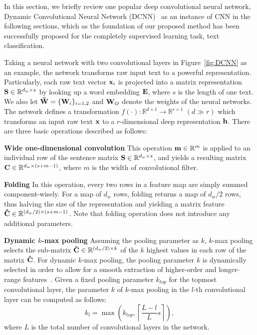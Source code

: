 \documentclass[review]{elsarticle}
\begin{document}

In this section, we briefly review one popular deep convolutional neural network, Dynamic Convolutional Neural Network (DCNN)~\cite{16_blunsom2014convolutional} as an instance of CNN in the following sections, which as the foundation of our proposed method has been successfully proposed for the completely supervised learning task, text classification.

Taking a neural network with two convolutional layers in Figure~\ref{fig:DCNN} as an example, the network transforms raw input text to a powerful representation. Particularly, each raw text vector \({{\bf{x}}_i}\) is projected into a matrix representation \({\bf{S}} \in {\mathbb{R}^{{d_w} \times s}}\) by looking up a word embedding \({\bf{E}}\), where \({s}\) is the length of one text. We also let \({\bf{\tilde W}} = {\{ {{\bf{W}}_i}\} _{i = 1,2}}\) and \({{\bf{W}}_O}\) denote the weights of the neural networks. The network defines a transformation \(f( \cdot ):{\mathbb{R}^{d \times 1}} \to {\mathbb{R}^{r \times 1}}\) \((d \gg r)\) which transforms an input raw text \({\bf{x}}\) to a \(r\)-dimensional deep representation \({\bf{h}}\). There are three basic operations described as follows:

 {\bf{Wide one-dimensional convolution}} This operation \({\bf{m}} \in {\mathbb{R}^m}\) is applied to an individual row of the sentence matrix \({\bf{S}} \in {\mathbb{R}^{{d_w} \times s}}\), and yields a resulting matrix \({\bf{C}} \in {\mathbb{R}^{  {d_w} \times {(s + m - 1)} }}\), where \(m\) is the width of convolutional filter.


 {\bf{Folding}}  In this operation, every two rows in a feature map are simply summed component-wisely. For a map of \(d_w\) rows, folding returns a map of \(d_w/2\) rows, thus halving the size of the representation and yielding a matrix feature \({\bf{\hat C}} \in {\mathbb{R}^{  {(d_w/2)} \times {(s + m - 1)} }}\). Note that folding operation does not introduce any additional parameters.

{\bf{Dynamic \(k\)-max pooling}} Assuming the pooling parameter as \(k\), \(k\)-max pooling selects the sub-matrix \({\bf{\bar C}} \in {\mathbb{R}^{  {(d_w/2)} \times {k} }}\) of the \(k\) highest values in each row of the matrix \({\bf{\hat C}}\). For dynamic \(k\)-max pooling, the pooling parameter \(k\) is dynamically selected in order to allow for a smooth extraction of higher-order and longer-range features~\cite{16_blunsom2014convolutional}. Given a fixed pooling parameter \(k_{top}\) for the topmost convolutional layer, the parameter \(k\) of \(k\)-max pooling in the \(l\)-th convolutional layer can be computed as follows:
\begin{equation}
{k_l} = \max ({k_{top}},\left\lceil {\frac{{L - l}}{L}s} \right\rceil ),
\label{eq:Ktop}
\end{equation}
where \(L\) is the total number of convolutional layers in the network.
\end{document}
